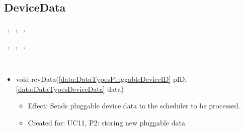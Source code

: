   \subsection{DeviceData}\label{int:OnlineServiceOnlineServiceDeviceDataSchedulerDeviceData}
    \begin{description}
      \item[Provided by:] \iconcomponent{}~, \iconcomponent{}~, \iconcomponent{}~, \iconcomponent{}~
      \item[Required by:] \iconcomponent{}~, \iconcomponent{}~, \iconcomponent{}~, \iconcomponent{}~
      \item[Operations:] ~
    \begin{itemize}[noitemsep,nolistsep,leftmargin=-.25cm]
      \item \textsf{void rcvData(\ref{data:DataTypesPluggableDeviceID} pID, \ref{data:DataTypesDeviceData} data)}
        \begin{itemize}[noitemsep,nolistsep]
           \item Effect: Sends pluggable device data to the scheduler to be processed.
\item Created for: UC11, P2: storing new pluggable data
        \end{itemize}
    \end{itemize}
    \end{description}

